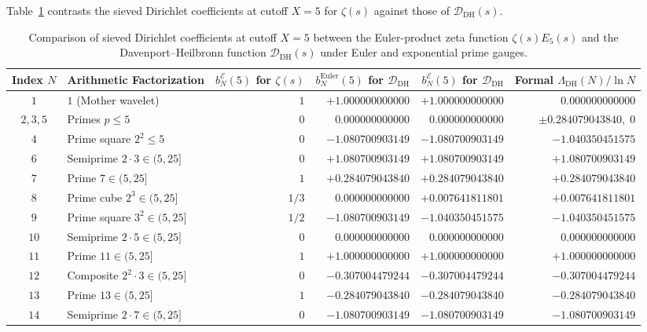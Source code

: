\documentclass[11pt,reqno]{amsart}
\theoremstyle{definition}
\theoremstyle{remark}
\numberwithin{equation}{section}
\newcommand{\DHf}{\mathrm{DH}}
\begin{document}
Table~\ref{tab:sieved_coeffs_comparison} contrasts the sieved Dirichlet coefficients at cutoff $X = 5$ for $\zeta(s)$ against those of $\mathcal{D}_{\DHf}(s)$.

\begin{table}[t]
\centering
\caption{Comparison of sieved Dirichlet coefficients at cutoff $X = 5$ between the Euler-product zeta function $\zeta(s)E_5(s)$ and the Davenport--Heilbronn function $\mathcal{D}_{\DHf}(s)$ under Euler and exponential prime gauges.}\label{tab:sieved_coeffs_comparison}
\scriptsize
\begin{tabular}{@{}clrrrr@{}}
\toprule
Index $N$ & Arithmetic Factorization & $b_N^{\mathcal{E}}(5)$ for $\zeta(s)$ & $b_N^{\mathrm{Euler}}(5)$ for $\mathcal{D}_{\DHf}$ & $b_N^{\mathcal{E}}(5)$ for $\mathcal{D}_{\DHf}$ & Formal $\Lambda_{\DHf}(N)/\ln N$ \\
\midrule
$1$ & $1$ (Mother wavelet) & $1$ & $+1.000000000000$ & $+1.000000000000$ & $0.000000000000$ \\
$2, 3, 5$ & Primes $p \le 5$ & $0$ & $0.000000000000$ & $0.000000000000$ & $\pm 0.284079043840,\; 0$ \\
$4$ & Prime square $2^2 \le 5$ & $0$ & $-1.080700903149$ & $-1.080700903149$ & $-1.040350451575$ \\
$6$ & Semiprime $2\cdot 3 \in (5, 25]$ & $0$ & $+1.080700903149$ & $+1.080700903149$ & $+1.080700903149$ \\
$7$ & Prime $7 \in (5, 25]$ & $1$ & $+0.284079043840$ & $+0.284079043840$ & $+0.284079043840$ \\
$8$ & Prime cube $2^3 \in (5, 25]$ & $1/3$ & $0.000000000000$ & $+0.007641811801$ & $+0.007641811801$ \\
$9$ & Prime square $3^2 \in (5, 25]$ & $1/2$ & $-1.080700903149$ & $-1.040350451575$ & $-1.040350451575$ \\
$10$ & Semiprime $2\cdot 5 \in (5, 25]$ & $0$ & $0.000000000000$ & $0.000000000000$ & $0.000000000000$ \\
$11$ & Prime $11 \in (5, 25]$ & $1$ & $+1.000000000000$ & $+1.000000000000$ & $+1.000000000000$ \\
$12$ & Composite $2^2\cdot 3 \in (5, 25]$ & $0$ & $-0.307004479244$ & $-0.307004479244$ & $-0.307004479244$ \\
$13$ & Prime $13 \in (5, 25]$ & $1$ & $-0.284079043840$ & $-0.284079043840$ & $-0.284079043840$ \\
$14$ & Semiprime $2\cdot 7 \in (5, 25]$ & $0$ & $-1.080700903149$ & $-1.080700903149$ & $-1.080700903149$ \\
\bottomrule
\end{tabular}
\end{table}
\end{document}
